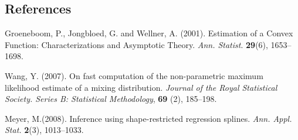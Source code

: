 \documentclass[12pt]{article}
\begin{document}
%        
%
%        

\subsection*{References}

\begin{description}

\item
 Groeneboom, P., Jongbloed, G. and Wellner, A. (2001). Estimation of a Convex Function: Characterizations and Asymptotic Theory. \textit{Ann. Statist}. \textbf{29}(6), 1653--1698. 

\item
Wang, Y. (2007). On fast computation of the non-parametric maximum likelihood estimate of a mixing distribution. \textit{Journal of the Royal Statistical Society. Series B: Statistical Methodology}, \textbf{69} (2), 185--198. 


\item
Meyer, M.(2008). Inference using shape-restricted regression splines. 
\textit{Ann. Appl. Stat.} \textbf{2}(3), 1013--1033.
\end{description}
\end{document}
